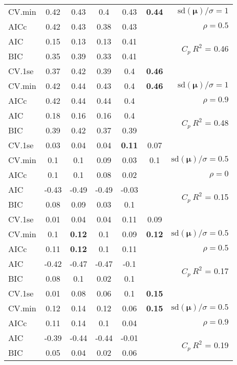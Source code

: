 \documentclass[12pt]{article}
\newcommand{\mr}[1]{\mathrm{#1}}
\newcommand{\bm}[1]{\mathbf{#1}}
\begin{document}
\begin{table}[p]
\begin{center}
\begin{tabular}{l*{5}{c}|r}
CV.min & 0.42 & 0.43 & 0.4 & 0.43 & {\bf 0.44} &  $\mr{sd}(\bm{\mu})/\sigma=1$ \\
AICc & 0.42 & 0.43 & 0.38 & 0.43 & & $\rho=0.5$ \\
AIC & 0.15 & 0.13 & 0.13 & 0.41 & & \multirow{2}{*}{$C_p ~ R^2$ = 0.46} \\
BIC & 0.35 & 0.39 & 0.33 & 0.41 & & \\
 \hline 
CV.1se & 0.37 & 0.42 & 0.39 & 0.4 & {\bf 0.46} &\\
CV.min & 0.42 & 0.44 & 0.43 & 0.4 & {\bf 0.46} &  $\mr{sd}(\bm{\mu})/\sigma=1$ \\
AICc & 0.42 & 0.44 & 0.44 & 0.4 & & $\rho=0.9$ \\
AIC & 0.18 & 0.16 & 0.16 & 0.4 & & \multirow{2}{*}{$C_p ~ R^2$ = 0.48} \\
BIC & 0.39 & 0.42 & 0.37 & 0.39 & & \\
 \hline 
CV.1se & 0.03 & 0.04 & 0.04 & {\bf 0.11} & 0.07 &\\
CV.min & 0.1 & 0.1 & 0.09 & 0.03 & 0.1 &  $\mr{sd}(\bm{\mu})/\sigma=0.5$ \\
AICc & 0.1 & 0.1 & 0.08 & 0.02 & & $\rho=0$ \\
AIC & -0.43 & -0.49 & -0.49 & -0.03 & & \multirow{2}{*}{$C_p ~ R^2$ = 0.15} \\
BIC & 0.08 & 0.09 & 0.03 & 0.1 & & \\
 \hline 
CV.1se & 0.01 & 0.04 & 0.04 & 0.11 & 0.09 &\\
CV.min & 0.1 & {\bf 0.12} & 0.1 & 0.09 & {\bf 0.12} &  $\mr{sd}(\bm{\mu})/\sigma=0.5$ \\
AICc & 0.11 & {\bf 0.12} & 0.1 & 0.11 & & $\rho=0.5$ \\
AIC & -0.42 & -0.47 & -0.47 & -0.1 & & \multirow{2}{*}{$C_p ~ R^2$ = 0.17} \\
BIC & 0.08 & 0.1 & 0.02 & 0.1 & & \\
 \hline 
CV.1se & 0.01 & 0.08 & 0.06 & 0.1 & {\bf 0.15} &\\
CV.min & 0.12 & 0.14 & 0.12 & 0.06 & {\bf 0.15} &  $\mr{sd}(\bm{\mu})/\sigma=0.5$ \\
AICc & 0.11 & 0.14 & 0.1 & 0.04 & & $\rho=0.9$ \\
AIC & -0.39 & -0.44 & -0.44 & -0.01 & & \multirow{2}{*}{$C_p ~ R^2$ = 0.19} \\
BIC & 0.05 & 0.04 & 0.02 & 0.06 & & \\
 \hline 
\end{tabular}
\end{center}
\vspace{-1cm}
\end{table}
\end{document}
